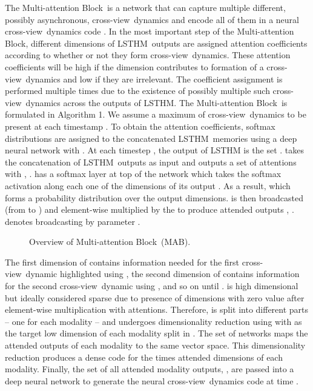 \documentclass[letterpaper]{article} \usepackage{aaai18}  \usepackage{times}  \usepackage{helvet}  \usepackage{courier}  \usepackage{url}  \usepackage{graphicx}  \usepackage{multirow}
\newcommand{\mab}{Multi-attention Block}
\newcommand{\mabs}{MAB}
\newcommand{\inter}{cross-view}
\newcommand{\tnames}{LSTHM}
\begin{document}
The \mab \ is a network that can capture multiple different, possibly asynchronous, \inter \ dynamics and encode all of them in a neural \inter \ dynamics code . In the most important step of the \mab, different dimensions of \tnames \ outputs  are assigned attention coefficients according to whether or not they form \inter \ dynamics. These attention coefficients will be high if the dimension contributes to formation of a \inter \ dynamics and low if they are irrelevant. The coefficient assignment is performed multiple times due to the existence of possibly multiple such \inter \ dynamics across the outputs of \tnames. The \mab \ is formulated in Algorithm 1. We assume a maximum of  \inter \ dynamics to be present at each timestamp . To obtain the  attention coefficients,  softmax distributions are assigned to the concatenated \tnames \ memories using a deep neural network  with . At each timestep , the output of LSTHM is the set .  takes the concatenation of \tnames \ outputs  as input and outputs a set of  attentions  with , .  has a softmax layer at top of the network which takes the softmax activation along each one of the  dimensions of its output . As a result,  which forms a probability distribution over the output dimensions.  is then broadcasted (from  to ) and element-wise multiplied by the  to produce attended outputs , .  denotes broadcasting by parameter .

\begin{figure}[t!]
    \caption{Overview of \mab \ (\mabs).}
    \label{fig:overview}
\end{figure}

The first dimension of  contains information needed for the first \inter \ dynamic highlighted using , the second dimension of  contains information for the second \inter \ dynamic using , and so on until .  is high dimensional but ideally considered sparse due to presence of dimensions with zero value after element-wise multiplication with attentions. Therefore,  is split into  different parts -- one for each modality  -- and undergoes dimensionality reduction using  with  as the target low dimension of each modality split in . The set of networks  maps the attended outputs of each modality  to the same vector space. This dimensionality reduction produces a dense code  for the  times attended dimensions of each modality. Finally, the set of all  attended modality outputs, , are passed into a deep neural network  to generate the neural \inter \ dynamics code  at time . 
\end{document}

